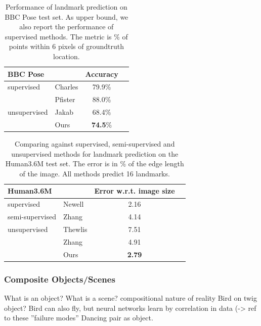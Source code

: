 		\begin{table}[t]
			\caption{{
			Performance of landmark prediction on BBC Pose test set. As upper bound, we also report the performance of supervised methods.
			The metric is \% of points within 6 pixels of groundtruth location. %
			}}
			\label{tab:bbcpose}
			\centering
			\begin{tabular}{ll|cr}
			\hline
			BBC Pose &   &    { Accuracy}  \\
			 \hline
			supervised & Charles \cite{charles13bbcpose} &
			   79.9\%  \\ %
			 & Pfister \cite{pfister15flowingconv}  &
			  88.0\%  \\ \hline %
			unsupervised &Jakab \cite{jakab18} &
			 68.4\%  \\  %
			  &Ours &  \textbf{74.5}\% \\
			\hline
			\end{tabular}
		\end{table}
		\begin{table}[t]
			\caption{{Comparing against supervised, semi-supervised and unsupervised methods for landmark prediction on the Human3.6M test set. The
			error is in \% of the edge length of the image. All methods predict 16 landmarks.
			}}
			\label{tab:human}
			\centering
			\begin{tabular}{ll|cr}
			\hline
			 Human3.6M   & &  { Error w.r.t. image size}  \\
			 \hline
			 supervised & Newell \cite{newell16hourglass}
			  &2.16  \\  \hline
			 semi-supervised & Zhang \cite{zhang18}
			  & 4.14  \\ \hline
			 unsupervised & Thewlis \cite{thewlis17}
			 & 7.51  \\
			  & Zhang \cite{zhang18}
				& 4.91 \\
			  & Ours& \textbf{2.79} \\
			\hline
			\end{tabular}
		\end{table}

		\subsubsection{Composite Objects/Scenes}
			What is an object? What is a scene?
			compositional nature of reality
			Bird on twig object? Bird can also fly, but neural networks learn by correlation in data (-> ref to these ''failure modes''
			Dancing pair as object.
